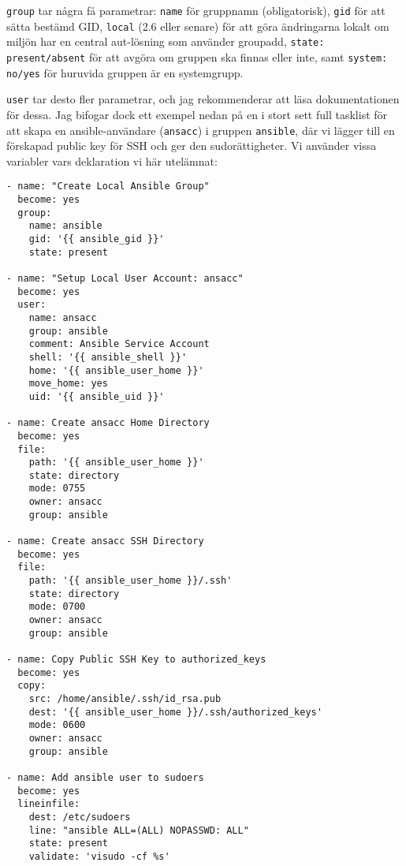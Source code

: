 \texttt{group} tar några få parametrar: \texttt{name} för gruppnamn (obligatorisk), \texttt{gid} för att sätta 
bestämd GID, \texttt{local} (2.6 eller senare) för att göra ändringarna lokalt om miljön har en central aut-lösning 
som använder groupadd, \texttt{state: present/absent} för att avgöra om gruppen ska finnas eller inte, samt 
\texttt{system: no/yes} för huruvida gruppen är en systemgrupp.

\texttt{user} tar desto fler parametrar, och jag rekommenderar att läsa dokumentationen för dessa. Jag bifogar dock
ett exempel nedan på en i stort sett full tasklist för att skapa en ansible-användare (\texttt{ansacc}) i gruppen 
\texttt{ansible}, där vi lägger till en förskapad public key för SSH och ger den sudorättigheter. Vi använder vissa
variabler vars deklaration vi här utelämnat:
\newpage

\begin{verbatim}
- name: "Create Local Ansible Group"
  become: yes
  group:
    name: ansible
    gid: '{{ ansible_gid }}'
    state: present

- name: "Setup Local User Account: ansacc"
  become: yes
  user:
    name: ansacc
    group: ansible
    comment: Ansible Service Account
    shell: '{{ ansible_shell }}'
    home: '{{ ansible_user_home }}'
    move_home: yes
    uid: '{{ ansible_uid }}'

- name: Create ansacc Home Directory
  become: yes
  file:
    path: '{{ ansible_user_home }}'
    state: directory
    mode: 0755
    owner: ansacc
    group: ansible

- name: Create ansacc SSH Directory
  become: yes
  file:
    path: '{{ ansible_user_home }}/.ssh'
    state: directory
    mode: 0700
    owner: ansacc
    group: ansible

- name: Copy Public SSH Key to authorized_keys
  become: yes
  copy:
    src: /home/ansible/.ssh/id_rsa.pub
    dest: '{{ ansible_user_home }}/.ssh/authorized_keys'
    mode: 0600
    owner: ansacc
    group: ansible

- name: Add ansible user to sudoers
  become: yes
  lineinfile:
    dest: /etc/sudoers
    line: "ansible ALL=(ALL) NOPASSWD: ALL"
    state: present
    validate: 'visudo -cf %s'
\end{verbatim}



